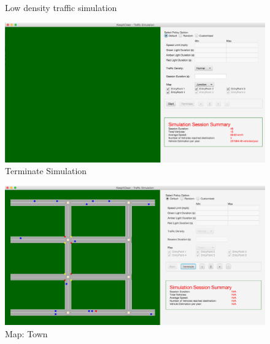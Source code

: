 \documentclass[11pt]{article}
\begin{document}
\begin{enumerate}
\begin{figure}[H]
        \centering
        \caption{Low density traffic simulation}
        \label{fig:test7}
\end{figure}
\begin{figure}[H]
        \includegraphics[width=12cm]{Test3}
        \centering
        \caption{Terminate Simulation}
        \label{fig:test3}
\end{figure}

\begin{figure}[H]
        \includegraphics[width=12cm]{Test8}
        \centering
        \caption{Map: Town}
        \label{fig:test8}
\end{figure}




\end{enumerate}
\end{document}
